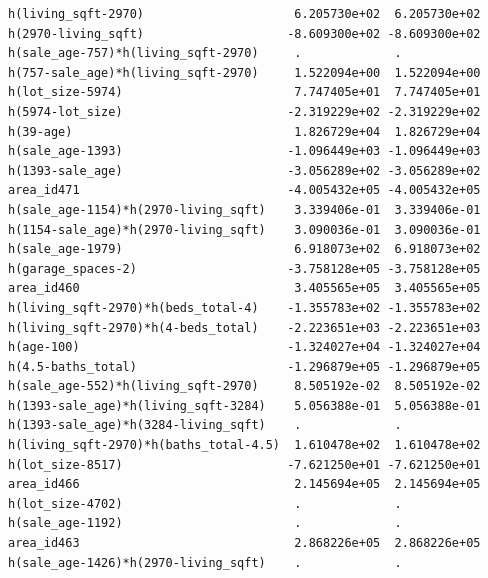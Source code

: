 \documentclass[
]{article}
\begin{document}
\begin{verbatim}
h(living_sqft-2970)                     6.205730e+02  6.205730e+02
h(2970-living_sqft)                    -8.609300e+02 -8.609300e+02
h(sale_age-757)*h(living_sqft-2970)     .             .           
h(757-sale_age)*h(living_sqft-2970)     1.522094e+00  1.522094e+00
h(lot_size-5974)                        7.747405e+01  7.747405e+01
h(5974-lot_size)                       -2.319229e+02 -2.319229e+02
h(39-age)                               1.826729e+04  1.826729e+04
h(sale_age-1393)                       -1.096449e+03 -1.096449e+03
h(1393-sale_age)                       -3.056289e+02 -3.056289e+02
area_id471                             -4.005432e+05 -4.005432e+05
h(sale_age-1154)*h(2970-living_sqft)    3.339406e-01  3.339406e-01
h(1154-sale_age)*h(2970-living_sqft)    3.090036e-01  3.090036e-01
h(sale_age-1979)                        6.918073e+02  6.918073e+02
h(garage_spaces-2)                     -3.758128e+05 -3.758128e+05
area_id460                              3.405565e+05  3.405565e+05
h(living_sqft-2970)*h(beds_total-4)    -1.355783e+02 -1.355783e+02
h(living_sqft-2970)*h(4-beds_total)    -2.223651e+03 -2.223651e+03
h(age-100)                             -1.324027e+04 -1.324027e+04
h(4.5-baths_total)                     -1.296879e+05 -1.296879e+05
h(sale_age-552)*h(living_sqft-2970)     8.505192e-02  8.505192e-02
h(1393-sale_age)*h(living_sqft-3284)    5.056388e-01  5.056388e-01
h(1393-sale_age)*h(3284-living_sqft)    .             .           
h(living_sqft-2970)*h(baths_total-4.5)  1.610478e+02  1.610478e+02
h(lot_size-8517)                       -7.621250e+01 -7.621250e+01
area_id466                              2.145694e+05  2.145694e+05
h(lot_size-4702)                        .             .           
h(sale_age-1192)                        .             .           
area_id463                              2.868226e+05  2.868226e+05
h(sale_age-1426)*h(2970-living_sqft)    .             .           
                                                                  

\end{verbatim}
\end{document}
